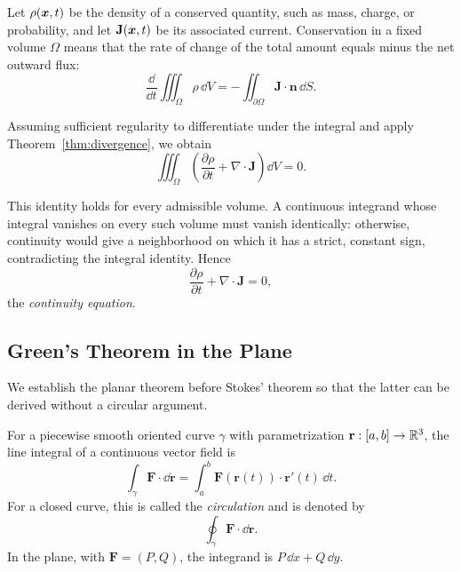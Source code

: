 \begin{example}
\label{ex:continuity-equation}
Let $\rho(\bm{x},t)$ be the density of a conserved quantity, such as mass, charge, or probability, and let $\mathbf{J}(\bm{x},t)$ be its associated current. Conservation in a fixed volume $\Omega$ means that the rate of change of the total amount equals minus the net outward flux:
\begin{equation}
\frac{\dd}{\dd t}\iiint_\Omega\rho\,\dd V
=-\iint_{\partial\Omega}\mathbf{J}\cdot\mathbf{n}\,\dd S.
\end{equation}

Assuming sufficient regularity to differentiate under the integral and apply Theorem~\ref{thm:divergence}, we obtain
\begin{equation}
\iiint_\Omega\left(\frac{\partial\rho}{\partial t}+\nabla\cdot\mathbf{J}\right)\dd V=0.
\end{equation}

This identity holds for every admissible volume. A continuous integrand whose integral vanishes on every such volume must vanish identically: otherwise, continuity would give a neighborhood on which it has a strict, constant sign, contradicting the integral identity. Hence
\begin{equation}
\frac{\partial\rho}{\partial t}+\nabla\cdot\mathbf{J}=0,
\end{equation}
the \emph{continuity equation}.
\end{example}



\subsection{Green's Theorem in the Plane}
\label{sec:green-plane}

We establish the planar theorem before Stokes' theorem so that the latter can be derived without a circular argument.

\begin{definition}
For a piecewise smooth oriented curve $\gamma$ with parametrization $\mathbf{r}:[a,b]\to\mathbb{R}^3$, the line integral of a continuous vector field is
\begin{equation}
\int_\gamma\mathbf{F}\cdot\dd\mathbf{r}
=\int_a^b\mathbf{F}(\mathbf{r}(t))\cdot\mathbf{r}'(t)\,\dd t.
\end{equation}
For a closed curve, this is called the \emph{circulation} and is denoted by
\[
\oint_\gamma\mathbf{F}\cdot\dd\mathbf{r}.
\]
In the plane, with $\mathbf{F}=(P,Q)$, the integrand is $P\,\dd x+Q\,\dd y$.
\end{definition}

